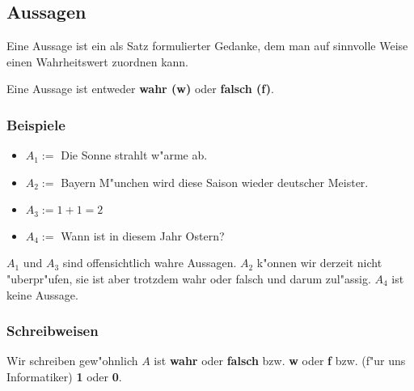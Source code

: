 \subsection{Aussagen}
\begin{definition}[Aussage]
Eine Aussage ist ein als Satz formulierter Gedanke, dem man auf sinnvolle Weise einen Wahrheitswert zuordnen kann.
\end{definition}

\begin{axiom}
Eine Aussage ist entweder \textbf{wahr (w)} oder \textbf{falsch (f)}.
\end{axiom}

\subsubsection*{Beispiele}
\begin{itemize}
\item $A_1 := $ Die Sonne strahlt w"arme ab.
\item $A_2 := $ Bayern M"unchen wird diese Saison wieder deutscher Meister.
\item $A_3 := 1+1 = 2$
\item $A_4 := $ Wann ist in diesem Jahr Ostern?
\end{itemize}
$A_1$ und $A_3$ sind offensichtlich wahre Aussagen. $A_2$ k"onnen wir derzeit nicht "uberpr"ufen, sie ist aber trotzdem wahr oder falsch und darum zul"assig. $A_4$ ist keine Aussage.

\subsubsection*{Schreibweisen}
Wir schreiben gew"ohnlich $A$ ist \textbf{wahr} oder \textbf{falsch} bzw. \textbf{w} oder \textbf{f} bzw. (f"ur uns Informatiker) \textbf{1} oder \textbf{0}.


